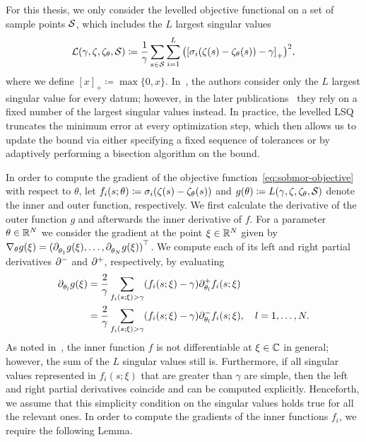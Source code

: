 For this thesis, we only consider the levelled objective functional on a set of sample points $\mcl{S}$, which includes the $L$ largest singular values
\begin{equation}\label{eq:sobmor-objective}
    \mcl{L}(\gamma, \tfunc, \tfunc_\theta, \mcl{S}) \coloneqq \frac{1}{\gamma} \sum\limits_{s \in \mcl{S}} \sum\limits_{i = 1}^L {\left( {[\sigma_i(\tfunc(s) - \tfunc_\theta(s)) - \gamma]}_+ \right)}^2,
\end{equation}
where we define ${[x]}_+ \coloneqq \max \{ 0, x \}$.
In~\cite{Schwerdtner2021, SV2021}, the authors consider only the $L$ largest singular value for every datum; however, in the later publications~\cite{Schwerdtner2023, SV2023} they rely on a fixed number of the largest singular values instead.
In practice, the levelled \ac{LSQ} truncates the minimum error at every optimization step, which then allows us to update the bound via either specifying a fixed sequence of tolerances or by adaptively performing a bisection algorithm on the bound.

In order to compute the gradient of the objective function~\eqref{eq:sobmor-objective} with respect to $\theta$, let $f_i(s; \theta) \coloneqq \sigma_i(\tfunc(s) - \tfunc_\theta(s))$ and $g(\theta) \coloneqq L(\gamma, \tfunc, \tfunc_\theta, \mcl{S})$ denote the inner and outer function, respectively.
We first calculate the derivative of the outer function $g$ and afterwards the inner derivative of $f$.
For a parameter $\theta \in \bb{R}^N$ we consider the gradient at the point $\xi \in \bb{R}^N$ given by $\nabla_\theta g(\xi) = {(\pd[\theta_1]{} g(\xi), \dots, \pd[\theta_N]{} g(\xi))}\trans$.
We compute each of its left and right partial derivatives $\pd[]{-}$ and $\pd[]{+}$, respectively, by evaluating
\begin{equation}\label{eq:outer-sobmor-objective-gradient}
    \begin{alignedat}{1}
        \pd[\theta_l]{} g(\xi) &= \frac{2}{\gamma} \sum\limits_{f_i(s; \xi) > \gamma} (f_i(s; \xi) - \gamma) \pd[\theta_l]{+} f_i(s; \xi) \\
        &= \frac{2}{\gamma} \sum\limits_{f_i(s; \xi) > \gamma} (f_i(s; \xi) - \gamma) \pd[\theta_l]{-} f_i(s; \xi),\quad l = 1, \dots, N.
    \end{alignedat}
\end{equation}
As noted in~\cite[Remark~3.8]{SV2023}, the inner function $f$ is not differentiable at $\xi \in \bb{C}$ in general; however, the sum of the $L$ singular values still is.
Furthermore, if all singular values represented in $f_i(s; \xi)$ that are greater than $\gamma$ are simple, then the left and right partial derivatives coincide and can be computed explicitly.
Henceforth, we assume that this simplicity condition on the singular values holds true for all the relevant ones.
In order to compute the gradients of the inner functions $f_i$, we require the following Lemma.

